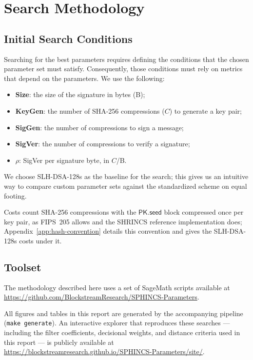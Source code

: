 \section{Search Methodology}

\subsection{Initial Search Conditions}
Searching for the best parameters requires defining the conditions that the chosen parameter set must satisfy. Consequently, those conditions must rely on metrics that depend on the parameters. We use the following:

\begin{itemize}
    \item \textbf{Size}: the size of the signature in bytes (B);
    \item \textbf{KeyGen}: the number of SHA-256 compressions ($C$) to generate a key pair;
    \item \textbf{SigGen}: the number of compressions to sign a message;
    \item \textbf{SigVer}: the number of compressions to verify a signature;
    \item \textbf{$\rho$}: SigVer per signature byte, in $C$/B.
\end{itemize}

We choose SLH-DSA-128s as the baseline for the search; this gives us an intuitive way to compare custom parameter sets against the standardized scheme on equal footing.

Costs count SHA-256 compressions with the $\mathsf{PK.seed}$ block compressed once per key pair, as FIPS~205 allows and the SHRINCS reference implementation does; Appendix~\ref{app:hash-convention} details this convention and gives the SLH-DSA-128s costs under it.

\subsection{Toolset}
The methodology described here uses a set of SageMath scripts available at \url{https://github.com/BlockstreamResearch/SPHINCS-Parameters}.

All figures and tables in this report are generated by the accompanying pipeline (\texttt{make generate}). An interactive explorer that reproduces these searches — including the filter coefficients, decisional weights, and distance criteria used in this report — is publicly available at \url{https://blockstreamresearch.github.io/SPHINCS-Parameters/site/}.

